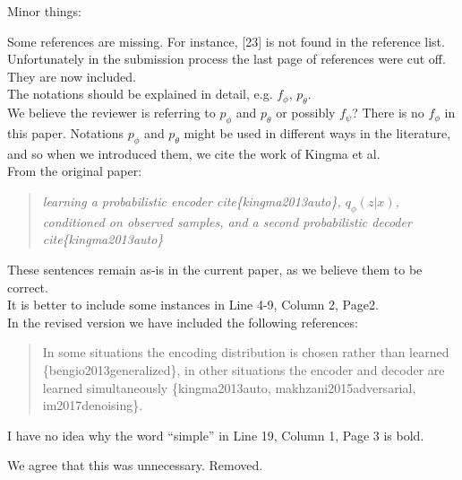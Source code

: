 \documentclass[a4paper,11pt]{article}
\begin{document}
Minor things: \newline

{\color{blue}
Some references are missing. For instance, [23] is not found in the reference list.}\\

Unfortunately in the submission process the last page of references were cut off. They are now included.\\

{\color{blue}
The notations should be explained in detail, e.g. $f_\phi$, $p_\theta$.} \\

We believe the reviewer is referring to $p_\phi$ and $p_\theta$ or possibly $f_\psi$? There is no $f_\phi$ in this paper. Notations $p_\phi$ and $p_\theta$ might be used in different ways in the literature, and so when we introduced them, we cite the work of Kingma et al.\\

From the original paper:
\begin{quote}
    {\it learning a \textit{probabilistic encoder} cite\{kingma2013auto\}, $q_\phi(z|x)$, conditioned on observed samples, and a second \textit{probabilistic decoder} cite\{kingma2013auto\}}
\end{quote} 
These sentences remain as-is in the current paper, as we believe them to be correct.\\

{\color{blue}
It is better to include some instances in Line 4-9, Column 2, Page2.}\\

In the revised version we have included the following references:
{\color{red}
\begin{quote}

In some situations the encoding distribution is chosen rather than learned \{bengio2013generalized\}, in other situations the encoder and decoder are learned simultaneously \{kingma2013auto, makhzani2015adversarial, im2017denoising\}.
\end{quote}

}

{\color{blue}
I have no idea why the word “simple” in Line 19, Column 1, Page 3 is bold.}\newline

We agree that this was unnecessary.  Removed. \newline
\end{document}
